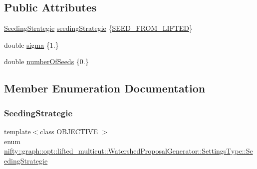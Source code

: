 \subsection*{Public Attributes}
\begin{DoxyCompactItemize}
\item 
\hyperlink{structnifty_1_1graph_1_1opt_1_1lifted__multicut_1_1WatershedProposalGenerator_1_1SettingsType_adb1dc7c5efbaf2442345aaa665aa2027}{Seeding\+Strategie} \hyperlink{structnifty_1_1graph_1_1opt_1_1lifted__multicut_1_1WatershedProposalGenerator_1_1SettingsType_a387d22edfea50e580158045e2e39316d}{seeding\+Strategie} \{\hyperlink{structnifty_1_1graph_1_1opt_1_1lifted__multicut_1_1WatershedProposalGenerator_1_1SettingsType_adb1dc7c5efbaf2442345aaa665aa2027a7282202a01543dc6167933813f619626}{S\+E\+E\+D\+\_\+\+F\+R\+O\+M\+\_\+\+L\+I\+F\+T\+ED}\}
\item 
double \hyperlink{structnifty_1_1graph_1_1opt_1_1lifted__multicut_1_1WatershedProposalGenerator_1_1SettingsType_a0e953fc83386175059bb0eca942e8abf}{sigma} \{1.\}
\item 
double \hyperlink{structnifty_1_1graph_1_1opt_1_1lifted__multicut_1_1WatershedProposalGenerator_1_1SettingsType_a8c5a91c8525be02b50e67cbb7ccba3a1}{number\+Of\+Seeds} \{0.\}
\end{DoxyCompactItemize}


\subsection{Member Enumeration Documentation}
\mbox{\label{structnifty_1_1graph_1_1opt_1_1lifted__multicut_1_1WatershedProposalGenerator_1_1SettingsType_adb1dc7c5efbaf2442345aaa665aa2027}} 
\subsubsection{\texorpdfstring{Seeding\+Strategie}{SeedingStrategie}}
{\footnotesize\ttfamily template$<$class O\+B\+J\+E\+C\+T\+I\+VE $>$ \\
enum \hyperlink{structnifty_1_1graph_1_1opt_1_1lifted__multicut_1_1WatershedProposalGenerator_1_1SettingsType_adb1dc7c5efbaf2442345aaa665aa2027}{nifty\+::graph\+::opt\+::lifted\+\_\+multicut\+::\+Watershed\+Proposal\+Generator\+::\+Settings\+Type\+::\+Seeding\+Strategie}}

